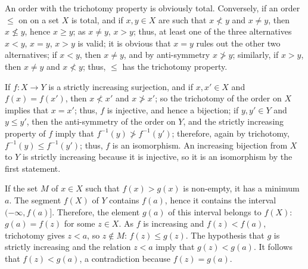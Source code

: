\documentclass{article}
\begin{document}
\begin{solution}[\ref{exe:4knqif5b}]
  \label{sol:ien6orgc}
  An order with the trichotomy property is obviously total.
  Conversely, if an order \(\leq\) on on a set \(X\) is total, and if
  \(x,y \in X\) are such that \(x \nless y\) and \(x \neq y\), then
  \(x \nleq y\), hence \(x \geq y\); as \(x \neq y\), \(x > y\); thus,
  at least one of the three alternatives \(x < y\), \(x = y\),
  \(x > y\) is valid; it is obvious that \(x = y\) rules out the other
  two alternatives; if \(x < y\), then \(x \neq y\), and by
  anti-symmetry \(x \ngtr y\); similarly, if \(x > y\), then
  \(x \neq y\) and \(x \nless y\); thus, \(\leq\) has the trichotomy
  property.
\end{solution}

\begin{solution}[\ref{exe:v1tw1ijd}]
  \label{sol:rd6deawb}
  If \(f : X \to Y\) is a strictly increasing surjection, and if
  \(x, x' \in X\) and \(f(x) = f(x')\), then \(x \nless x'\) and
  \(x \ngtr x'\); so the trichotomy of the order on \(X\) implies that
  \(x = x'\); thus, \(f\) is injective, and hence a bijection; if
  \(y, y' \in Y\) and \(y \leq y'\), then the anti-symmetry of the
  order on \(Y\), and the strictly increasing property of \(f\) imply
  that \(f^{-1}(y) \ngtr f^{-1}(y')\); therefore, again by trichotomy,
  \(f^{-1}(y) \leq f^{-1}(y')\); thus, \(f\) is an isomorphism.  An
  increasing bijection from \(X\) to \(Y\) is strictly increasing
  because it is injective, so it is an isomorphism by the first
  statement.
\end{solution}

\begin{solution}[\ref{exe:gsdhavsp}]
  \label{sol:ja6mjzt3}
  If the set \(M\) of \(x \in X\) such that \(f(x) > g(x)\) is
  non-empty, it has a minimum \(a\).  The segment \(f(X)\) of \(Y\)
  contains \(f(a)\), hence it contains the interval
  \((-\infty, f(a)]\).  Therefore, the element \(g(a)\) of this
  interval belongs to \(f(X)\): \(g(a) = f(z)\) for some \(z \in X\).
  As \(f\) is increasing and \(f(z) < f(a)\), trichotomy gives
  \(z < a\), so \(z \notin M\): \(f(z) \leq g(z)\).  The hypothesis
  that \(g\) is strictly increasing and the relation \(z < a\) imply
  that \(g(z) < g(a)\).  It follows that \(f(z) < g(a)\), a
  contradiction because \(f(z) = g(a)\).
\end{solution}
\end{document}

